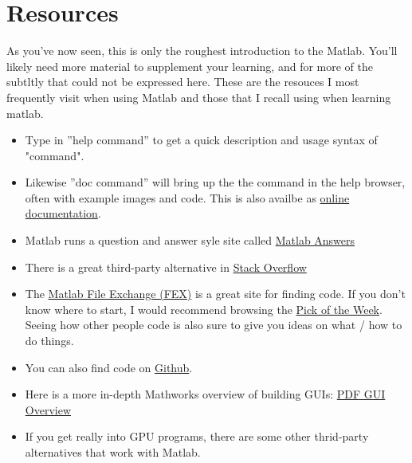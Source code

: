 
\pagebreak
\section{Resources}
As you've now seen, this is only the roughest introduction to the Matlab.
 You'll likely need more material to supplement your learning, and for more of the subtltly that could not be expressed here.
 These are the resouces I most frequently visit when using Matlab and those that I recall using when learning matlab.

\begin{itemize}
 \item Type in ''help command'' to get a quick description and usage syntax of "command".

 \item Likewise ''doc command'' will bring up the the command in the help browser, often with example images and code.
 This is also availbe as \href{http://www.mathworks.com/help/matlab/}{online documentation}.

 \item Matlab runs a question and answer syle site called \href{http://www.mathworks.com/matlabcentral/answers/}{Matlab Answers}

 \item There is a great third-party alternative in \href{http://stackoverflow.com/questions/tagged/matlab}{Stack Overflow}

 \item The \href{http://www.mathworks.com/matlabcentral/fileexchange/}{Matlab File Exchange (FEX)} is a great site for finding code.
 If you don't know where to start, I would recommend browsing the \href{http://blogs.mathworks.com/pick/}{Pick of the Week}.
 Seeing how other people code is also sure to give you ideas on what / how to do things.

 \item You can also find code on \href{https://github.com/}{Github}.

 \item Here is a more in-depth Mathworks overview of building GUIs: \href{http://www.mathworks.com/help/pdf_doc/matlab/buildgui.pdf}{PDF GUI Overview}

 \item If you get really into GPU programs, there are some other thrid-party alternatives that work with Matlab.
\end{itemize}
